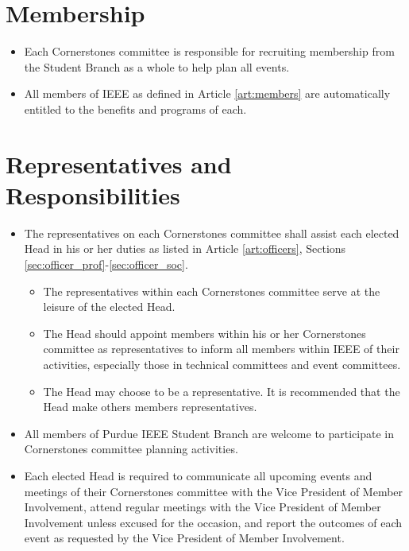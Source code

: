\documentclass[12pt]{constitution}
\begin{document}
\section{Membership}
\label{sec:corner_auto}
\begin{itemize}
    \item Each Cornerstones committee is responsible for recruiting membership from the Student Branch as a whole to help plan all events.
    \item All members of IEEE as defined in Article \ref{art:members} are automatically entitled to the benefits and programs of each.
\end{itemize}

\section{Representatives and Responsibilities}
\label{sec:corner_represent}
\begin{itemize}
    \item The representatives on each Cornerstones committee shall assist each elected Head in his or her duties as listed in Article \ref{art:officers}, Sections \ref{sec:officer_prof}-\ref{sec:officer_soc}.
    \begin{itemize}
        \item The representatives within each Cornerstones committee serve at the leisure of the elected Head.
        \item The Head should appoint members within his or her Cornerstones committee as representatives to inform all members within IEEE of their activities, especially those in technical committees and event committees.
        \item The Head may choose to be a representative. It is recommended that the Head make others members representatives.
    \end{itemize}
    \item All members of Purdue IEEE Student Branch are welcome to participate in Cornerstones committee planning activities.
    \item Each elected Head is required to communicate all upcoming events and meetings of their Cornerstones committee with the Vice President of Member Involvement, attend regular meetings with the Vice President of Member Involvement unless excused for the occasion, and report the outcomes of each event as requested by the Vice President of Member Involvement.
\end{itemize}
\end{document}
